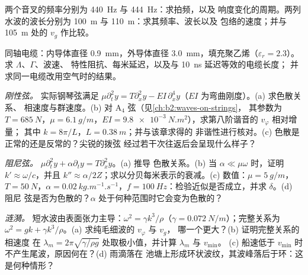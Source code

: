 \begin{exercise}[$\star$]\label{exo:b2:dispersion-wave-packets:3}
两个音叉的频率分别为 \qty{440}{Hz} 与 \qty{444}{Hz}：求拍频，以及
响度变化的周期。两列水波的波长分别为
\qty{100}{m} 与 \qty{110}{m}：求其频率、波长以及
包络的速度；并与 \qty{105}{m} 处的 $v_g$ 作比较。
\end{exercise}

\begin{exercise}[$\star$]\label{exo:b2:dispersion-wave-packets:4}
同轴电缆：内导体直径 \qty{0.9}{mm}，外导体直径
\qty{3.0}{mm}，填充聚乙烯（$\varepsilon_r = 2.3$）。求 $\Lambda$、$\Gamma$、波速、
特性阻抗、每米延迟，以及与 \qty{10}{ns} 延迟等效的电缆长度；
并求同一电缆改用空气时的结果。
\end{exercise}

\begin{exercise}[$\star\star$]\label{exo:b2:dispersion-wave-packets:5}
\emph{刚性弦。} 实际钢琴弦满足 $\mu\partial_t^2y = T\partial_x^2y
- EI\,\partial_x^4y$（$EI$ 为弯曲刚度）。(a) 求色散关系、
相速度与群速度。(b) 对 A$_4$ 弦（见\cref{ch:b2:waves-on-strings}，
其参数为 $T = \qty{685}{N}$，$\mu = \qty{6.1}{g/m}$，$EI =
\qty{9.8e-3}{N.m^2}$），求第八阶谐音的 $v_\varphi$ 相对增量；
其中 $k = 8\pi/L$，$L = \qty{0.38}{m}$；并与该章求得的
非谐性进行核对。(c) 色散是正常的还是反常的？尖锐的拨弦
经过若干次往返后会呈现什么样子？
\end{exercise}

\begin{exercise}[$\star\star$]\label{exo:b2:dispersion-wave-packets:6}
\emph{阻尼弦。} $\mu\partial_t^2y + \alpha\partial_ty = T\partial_x^2y$。(a) 推导
色散关系。(b) 当 $\alpha \ll \mu\omega$ 时，证明 $k' \approx \omega/c$，并且
$k'' \approx \alpha/2Z$；求以分贝每米表示的衰减。(c) 数值：$\mu =
\qty{5}{g/m}$，$T = \qty{50}{N}$，$\alpha = \qty{0.02}{kg.m^{-1}.s^{-1}}$，$f =
\qty{100}{Hz}$：检验近似是否成立，并求 $\delta$。(d) 阻尼
弦是否为色散的？$\alpha$ 处于何种范围时它会变为色散的？
\end{exercise}

\begin{exercise}[$\star\star$]\label{exo:b2:dispersion-wave-packets:7}
\emph{涟漪。} 短水波由表面张力主导：$\omega^2 =
\gamma k^3/\rho$（$\gamma = \qty{0.072}{N/m}$）；完整关系为 $\omega^2 = gk +
\gamma k^3/\rho$。(a) 求纯毛细波的 $v_\varphi$ 与 $v_g$，
哪一个更大？(b) 证明完整关系的相速度
在 $\lambda_m = 2\pi\sqrt{\gamma/\rho g}$ 处取极小值，并计算 $\lambda_m$ 与 $v_{\min}$。
(c) 船速低于 $v_{\min}$ 时不产生尾波，原因何在？(d) 雨滴落在
池塘上形成环状波纹，其波峰落后于环：这是何种情形？
\end{exercise}

